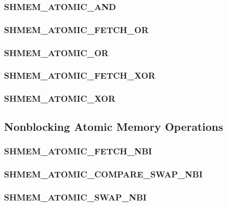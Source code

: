 \documentclass[10pt]{book}
\begin{document}
\subsubsection{\textbf{SHMEM\_ATOMIC\_AND}}
\label{subsec:shmem_atomic_and}


\subsubsection{\textbf{SHMEM\_ATOMIC\_FETCH\_OR}}
\label{subsec:shmem_atomic_fetch_or}


\subsubsection{\textbf{SHMEM\_ATOMIC\_OR}}
\label{subsec:shmem_atomic_or}


\subsubsection{\textbf{SHMEM\_ATOMIC\_FETCH\_XOR}}
\label{subsec:shmem_atomic_fetch_xor}


\subsubsection{\textbf{SHMEM\_ATOMIC\_XOR}}
\label{subsec:shmem_atomic_xor}


\subsection{Nonblocking Atomic Memory Operations}\label{sec:amo-nbi}

\subsubsection{\textbf{SHMEM\_ATOMIC\_FETCH\_NBI}}
\label{subsec:shmem_atomic_fetch_nbi}


\subsubsection{\textbf{SHMEM\_ATOMIC\_COMPARE\_SWAP\_NBI}}
\label{subsec:shmem_atomic_compare_swap_nbi}


\subsubsection{\textbf{SHMEM\_ATOMIC\_SWAP\_NBI}}
\label{subsec:shmem_atomic_swap_nbi}

\end{document}
